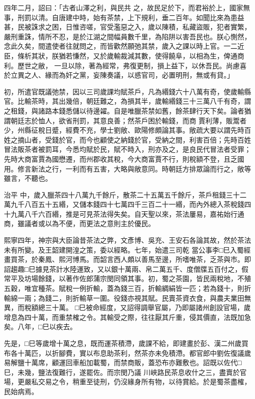 \begin{pinyinscope}
 四年二月，詔曰：「古者山澤之利，與民共
 之，故民足於下，而君裕於上，國家無事，刑罰以清。自唐建中時，始有茶禁，上下規利，垂二百年。如聞比來為患益甚，民被誅求之困，日惟咨嗟，官受濫惡之入，歲以陳積，私藏盜販，犯者實繁，嚴刑重誅，情所不忍，是於江湖之間幅員數千里，為陷阱以害吾民也。朕心惻然，念此久矣，間遣使者往就問之，而皆歡然願弛其禁，歲入之課以時上官。一二近臣，條析其狀，朕猶若慊然，又於歲輸裁減其數，使得饒阜，以相為生，俾通商利。歷世之敝，
 一旦以除，著為經常，弗復更制，損上益下，以休吾民。尚慮喜於立異之人、緣而為奸之黨，妄陳奏議，以惑官司，必置明刑，無或有貸。」



 初，所遣官既議弛禁，因以三司歲課均賦茶戶，凡為緡錢六十八萬有奇，使歲輸縣官。比輸茶時，其出幾倍，朝廷難之，為損其半，歲輸緡錢三十三萬八千有奇，謂之租錢，與諸路本錢悉儲以待邊糴。自是唯臘茶禁如舊，餘茶肆行天下矣。論者猶謂朝廷志於恤人，欲省刑罰，其意良善；然茶戶困於輸錢，而商
 賈利薄，販鬻者少，州縣征稅日蹙，經費不充，學士劉敞、歐陽修頗論其事。敞疏大要以謂先時百姓之摘山者，受錢於官，而今也顧使之納錢於官，受納之間，利害百倍；先時百姓冒法販茶者被罰耳，今悉均賦於民，賦不時入，刑亦及之，是良民代冒法者受罪；先時大商富賈為國懋遷，而州郡收其稅，今大商富賈不行，則稅額不登，且乏國用。修言新法之行，一利而有五害，大略與敞意同。時朝廷方排眾論而行之，敞等雖言，不聽也。



 治平
 中，歲入臘茶四十八萬九千餘斤，散茶二十五萬五千餘斤，茶戶租錢三十二萬九千八百五十五緡，又儲本錢四十七萬四千三百二十一緡，而內外總入茶稅錢四十九萬八千六百緡，推是可見茶法得失矣。自天聖以來，茶法屢易，嘉祐始行通商，雖議者或以為不便，而更法之意則主於優民。



 熙寧四年，神宗與大臣論昔茶法之弊，文彥博、吳充、王安石各論其故，然於茶法未有所變。及王韶建開湟之策，委以經略。七年，始遣三司乾
 當公事李□巳入蜀經畫買茶，於秦鳳、熙河博馬。而韶言西人頗以善馬至邊，所嗜唯茶，乏茶與市。即詔趨趣□巳據見茶計水陸運致，又以銀十萬兩、帛二萬五千、度僧牒五百付之，假常平及坊場餘錢，以著作佐郎蒲宗閔同領其事。初，蜀之茶園，皆民兩稅地，不殖五穀，唯宜種茶。賦稅一例折輸，蓋為錢三百，折輸綢絹皆一匹；若為錢十，則折輸綿一兩；為錢二，則折輸草一圍。役錢亦視其賦。民賣茶資衣食，與農夫業田無異，而稅額總三十萬。
 □巳被命經度，又詔得調舉官屬，乃即屬諸州創設官場，歲增息為四十萬，而重禁榷之令。其輸受之際，往往厭其斤重，侵其價直，法既加急矣。八年，□巳以疾去。



 先是，□巳等歲增十萬之息，既而運茶積滯，歲課不給，即建畫於彭、漢二州歲買布各十萬匹，以折腳費，實以布息助茶利，然茶亦未免積滯。都官郎中劉佐復議歲易解鹽十萬席，顧運回車船加載蜀，而禁商販，蓋恐布亦難敷也。詔既以佐代□巳，未幾，鹽法復難行，遂罷佐。而宗閔乃議
 川峽路民茶息收什之三，盡賣於官場，更嚴私交易之令，稍重至徒刑，仍沒緣身所有物，以待賞給。於是蜀茶盡榷，民始病焉。




\end{pinyinscope}
